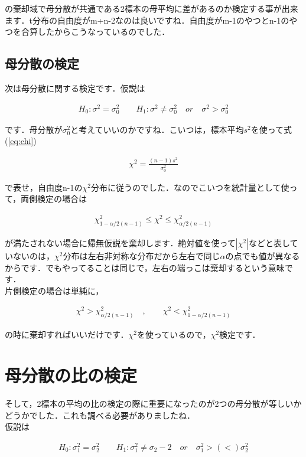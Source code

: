 \documentclass[11pt,a4paper]{ujreport} 	%
\begin{document}
の棄却域で母分散が共通である2標本の母平均に差があるのか検定する事が出来ます．t分布の自由度がm+n-2なのは良いですね．自由度がm-1のやつとn-1のやつを合算したからこうなっているのでした．

\subsection{母分散の検定}
次は母分散に関する検定です．仮説は

\begin{align}
  H_0 : \sigma^2 =\sigma_0^2 \qquad H_1: \sigma^2 \neq \sigma_0^2 \quad or \quad \sigma^2 > \sigma_0^2
\end{align}

です．母分散が$\sigma_0^2$と考えていいのかですね．こいつは，標本平均$s^2$を使って式(\ref{eq:chi})

\begin{align}
  \chi^2 = \frac{(n-1)s^2}{\sigma_0^2}
\end{align}

で表せ，自由度n-1の$\chi^2$分布に従うのでした．なのでこいつを統計量として使って，両側検定の場合は

\begin{align}
  \chi^2_{1-\alpha/2(n-1)} \leq \chi^2 \leq \chi^2_{\alpha/2(n-1)}
\end{align}

が満たされない場合に帰無仮説を棄却します．絶対値を使って$|\chi^2|$などと表していないのは，$\chi^2$分布は左右非対称な分布だから左右で同じ$\alpha$の点でも値が異なるからです．でもやってることは同じで，左右の端っこは棄却するという意味です．\\

片側検定の場合は単純に，

\begin{align}
  \chi^2 > \chi^2_{\alpha/2(n-1)}\quad,　\qquad \chi^2 < \chi^2_{1-\alpha/2(n-1)} 
\end{align}

の時に棄却すればいいだけです．$\chi^2$を使っているので，$\chi^2$検定です．


\section{母分散の比の検定}
そして，2標本の平均の比の検定の際に重要になったのが2つの母分散が等しいかどうかでした．これも調べる必要がありましたね．\\

仮説は

\begin{align}
  H_0 : \sigma_1^2 = \sigma_2^2 \qquad H_1 : \sigma_1^2 \neq \sigma_2-2 \quad or \quad \sigma_1^2 >(<) \sigma_2^2
\end{align}
\end{document}
